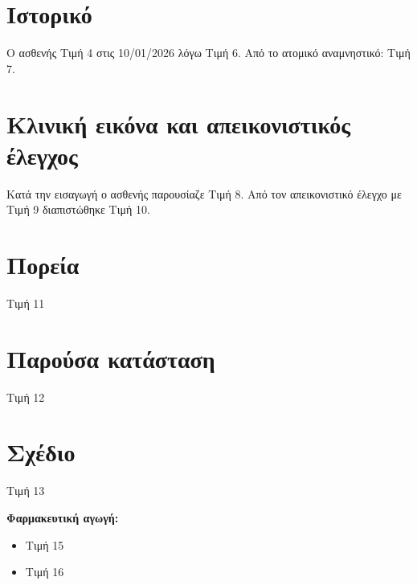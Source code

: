 \documentclass[10pt,greek]{article}
\begin{document}
\begin{PatientInfo}
\end{PatientInfo}

\section*{Ιστορικό}
Ο ασθενής Τιμή 4 στις 10/01/2026 λόγω Τιμή 6.
Από το ατομικό αναμνηστικό: Τιμή 7.

\section*{Κλινική εικόνα και απεικονιστικός έλεγχος}
Κατά την εισαγωγή ο ασθενής παρουσίαζε Τιμή 8.
Από τον απεικονιστικό έλεγχο με Τιμή 9 διαπιστώθηκε Τιμή 10.

\section*{Πορεία}
Τιμή 11

\section*{Παρούσα κατάσταση}
Τιμή 12

\section*{Σχέδιο}
Τιμή 13

\textbf{Φαρμακευτική αγωγή:}
\begin{itemize}[nosep]
\item Τιμή 15
\item Τιμή 16
\end{itemize}
\end{document}
